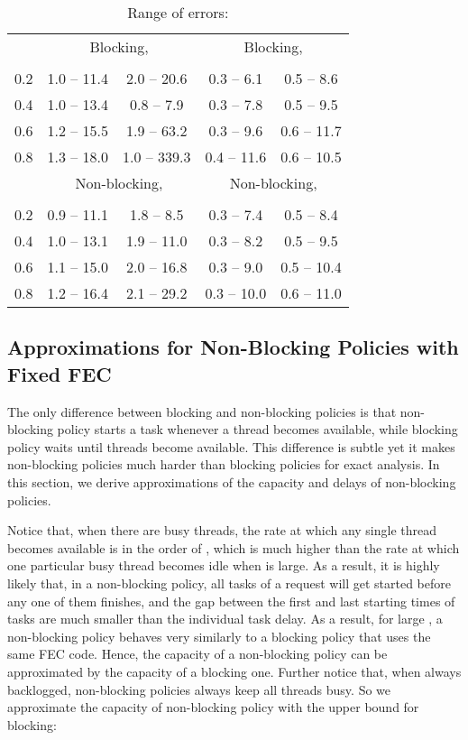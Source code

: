 \documentclass[journal]{IEEEtran}
\begin{document}
\begin{table}[t]
\centering
\begin{tabular}{|c|c|c|c|c|}
\hline
\multirow{2}{*}{} & \multicolumn{2}{c|}{ Blocking, }  & \multicolumn{2}{c|}{ Blocking, }\\
\cline{2-5}
&  &  &   & \\
\hline
0.2& 1.0 -- 11.4 & 2.0 -- 20.6 & 0.3 -- 6.1 & 0.5 -- 8.6\\
\hline
0.4& 1.0 -- 13.4 & 0.8 -- 7.9 & 0.3 -- 7.8 & 0.5 -- 9.5\\
\hline
0.6& 1.2 -- 15.5 & 1.9 -- 63.2 & 0.3 -- 9.6 & 0.6 -- 11.7\\
\hline
0.8& 1.3 -- 18.0 & 1.0 -- 339.3 & 0.4 -- 11.6 & 0.6 -- 10.5\\
\hline \hline
\multirow{2}{*}{} & \multicolumn{2}{c|}{ Non-blocking, }  & \multicolumn{2}{c|}{Non-blocking,  }\\
\cline{2-5}
&  &  &   & \\
\hline
0.2& 0.9 -- 11.1 & 1.8 -- 8.5 & 0.3 -- 7.4 & 0.5 -- 8.4\\
\hline
0.4& 1.0 -- 13.1 & 1.9 -- 11.0 & 0.3 -- 8.2 & 0.5 -- 9.5\\
\hline
0.6& 1.1 -- 15.0 & 2.0 -- 16.8 & 0.3 -- 9.0 & 0.5 -- 10.4\\
\hline
0.8& 1.2 -- 16.4 & 2.1 -- 29.2 & 0.3 -- 10.0 & 0.6 -- 11.0\\
\hline
\end{tabular}
\caption{Range of errors: }
\label{tab:error}
\vspace{-25pt}
\end{table}

\subsection{Approximations for Non-Blocking Policies with Fixed FEC}
The only difference between blocking and non-blocking policies is that non-blocking policy starts a task whenever a thread becomes available, while blocking policy waits until  threads become available. 
This difference is subtle yet it makes non-blocking policies much harder than blocking policies for exact analysis. In this section, we derive approximations of the capacity and delays of non-blocking policies. 

Notice that, when there are  busy threads, the rate at which any single thread becomes available is in the order of , which is much higher than the rate at which one particular busy thread becomes idle when  is large. As a result, it is highly likely that, in a non-blocking policy, all tasks of a request will get started before any one of them finishes, and the gap between the first and last starting times of tasks are much smaller than the individual task delay. As a result, for large ,  a non-blocking policy behaves very similarly to a blocking policy that uses the same FEC code. Hence, the capacity of a non-blocking policy can be approximated by the capacity of a blocking one. Further notice that, when always backlogged, non-blocking policies always keep all  threads busy. So we approximate the capacity of non-blocking policy with the upper bound for blocking:
\end{document}
